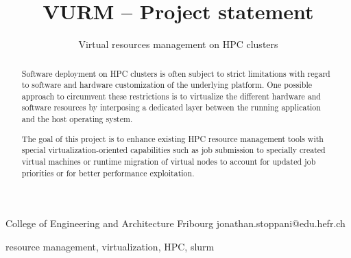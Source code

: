 \documentclass[10pt,authoryear]{sigplanconf} %
\begin{document}

{}


\title{VURM -- Project statement}
\subtitle{Virtual resources management on HPC clusters}

           {College of Engineering and Architecture Fribourg}
           {jonathan.stoppani@edu.hefr.ch}



\maketitle


\begin{abstract}
Software deployment on HPC clusters is often subject to strict limitations with regard to software and hardware customization of the underlying platform. One possible approach to circumvent these restrictions is to virtualize the different hardware and software resources by interposing a dedicated layer between the running application and the host operating system.

The goal of this project is to enhance existing HPC resource management tools with special virtualization-oriented capabilities such as job submission to specially created virtual machines or runtime migration of virtual nodes to account for updated job priorities or for better performance exploitation.
\end{abstract}

\keywords
resource management, virtualization, HPC, slurm

\end{document}
